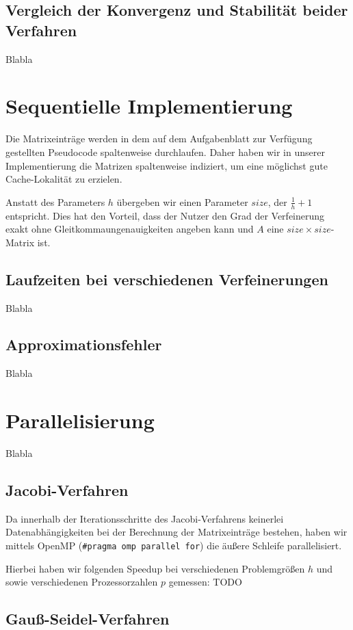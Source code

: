 \documentclass{article}
\begin{document}
\subsection{Vergleich der Konvergenz und Stabilität beider Verfahren}\label{konvergenz}
Blabla

\section{Sequentielle Implementierung}

Die Matrixeinträge werden in dem auf dem Aufgabenblatt zur Verfügung gestellten Pseudocode spaltenweise durchlaufen. Daher haben wir in unserer Implementierung die Matrizen spaltenweise indiziert, um eine möglichst gute Cache-Lokalität zu erzielen.

 Anstatt des Parameters $h$ übergeben wir einen Parameter $size$, der $\frac{1}{h}+1$ entspricht. Dies hat den Vorteil, dass der Nutzer den Grad der Verfeinerung exakt ohne Gleitkommaungenauigkeiten angeben kann und $A$ eine $size \times size$-Matrix ist.

\subsection{Laufzeiten bei verschiedenen Verfeinerungen}
Blabla
\subsection{Approximationsfehler}
Blabla

\section{Parallelisierung}
Blabla
\subsection{Jacobi-Verfahren} \label{parallel:jacobi}
Da innerhalb der Iterationsschritte des Jacobi-Verfahrens keinerlei Datenabhängigkeiten bei der Berechnung der Matrixeinträge bestehen, haben wir mittels OpenMP (\texttt{\#pragma omp parallel for}) die äußere Schleife parallelisiert.

Hierbei haben wir folgenden Speedup bei verschiedenen Problemgrößen $h$ und sowie verschiedenen Prozessorzahlen $p$ gemessen: TODO

\subsection{Gauß-Seidel-Verfahren}
\end{document}
